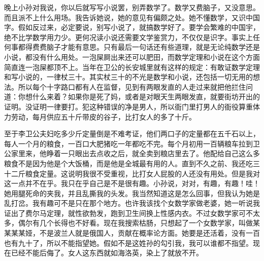 晚上小孙对我说，你以后就写写小说罢，别弄数学了。数学又费脑子，又没意思。而且派不上什么用场。我告诉她说，她的意见有偏颇之处。她不懂数学，又识中国字。假如反过来，必定要说，别写小说了，就搞数学好了。要学会繁难的中国宇，绝不比学数学用力少。更何况读小说还需要文学鉴赏力，不仅仅是识字。事实上任何事都得费费脑子才能有意思。只有最后一句话还有些道理，就是无论纯数学还是小说，都没有什么用处。一泡屎屙出来还可以肥田，而数学定理和小说在这个方面简直连一泡屎都顶不上。当年在卫公的长安城里就有这样的规定：有敢证数学定理和写小说的，一律杖三十。其实杖三十的不光是数学和小说，还包括一切无用的想法。所以每个十字路口都有人在监督，见到有两眼发直的人走过来就把他拦住问道：你想什么来着？如果你是死了妈，或者是对眼天生两眼发直，就要街坊开出的证明。没证明一律要打。犯这种错误的净是男人，所以衙门里打男人的衙役算重体力劳动，每月供应五十斤带皮的谷子，比打女人的多了十斤。 

至于李卫公夫妇吃多少斤定量倒是不难考证，他们两口子的定量都在五千石以上，每人一个月的粮食，一百口大肥猪吃一年都吃不完。每个月初用一百辆粮车拉到卫公家里来，他睁着一只眼出去点收之后，就全卖到粮店里去了。他配给自己这么多粮食不是因为他是个大饭桶，而是他是全城最有用的人。直到不久之前、我还吃三十二斤粮食定量。这说明我很不受重视，比打女人屁股的人还没有用处。但是我对这一点并不在乎。我只在乎自己是不是很有趣。小孙说，对对，有趣，有趣！哇！她用腿死命的夹我，并且乱撕我的头发。我当然知道这是怎么回事，但我认为她是乱打岔。我有趣可不是只在那个地方。也许我该找个女数学家做老婆，她一听说我证出了费尔马定理，就性欲勃发，跑到卫生间换上性感内衣。不过女数学家可不太多，偶尔有几个长得也不好看。现在我搜索枯肠，只想起了一个女数学家，叫做某某某某娅，不是波兰人就是俄国人，贡献在概率论方面。她要是还活着，没有一百也有九十了，所以不能指望她。假如不是这姓孙的勾引我，我可以谁都不指望。现在已经不能后侮了。女人这东西就如海洛英，染上了就放不开。 

